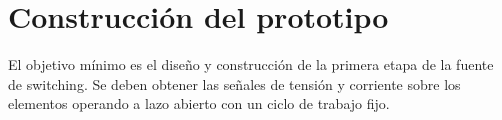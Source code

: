 \section{Construcción del prototipo}

El objetivo mínimo es el diseño y construcción de la primera etapa de la fuente de switching. 
Se deben obtener las señales de tensión y corriente sobre los elementos operando a lazo abierto con un ciclo de trabajo fijo. 